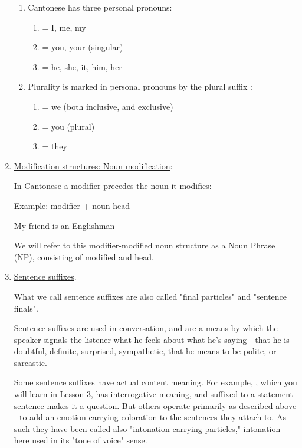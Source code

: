\begin{enumerate}
    \begin{enumerate}
        \item Cantonese has three personal pronouns:
        \begin{enumerate}
            \item {} = I, me, my
            \item {} = you, your (singular)
            \item {} = he, she, it, him, her
        \end{enumerate}
        \item Plurality is marked in personal pronouns by the plural suffix :
        \begin{enumerate}
            \item {} = we (both inclusive, and exclusive)
            \item {} = you (plural)
            \item {} = they
        \end{enumerate}
    \end{enumerate}

    \item \underline{Modification structures: Noun modification}:

    In Cantonese a modifier precedes the noun it modifies:

    Example: modifier + noun head

     My friend is an Englishman

    We will refer to this modifier-modified noun structure as a Noun Phrase (NP), consisting of modified and head.

    \item \underline{Sentence suffixes}.

    What we call sentence suffixes are also called "final particles" and "sentence finals".

    Sentence suffixes are used in conversation, and are a means by which the speaker signals the listener what he feels about what he's saying - that he is doubtful, definite, surprised, sympathetic, that he means to be polite, or sarcastic.

    Some sentence suffixes have actual content meaning. For example, , which you will learn in Lesson 3, has interrogative meaning, and suffixed to a statement sentence makes it a question. But others operate primarily as described above - to add an emotion-carrying coloration to the sentences they attach to. As such they have been called also "intonation-carrying particles," intonation here used in its "tone of voice" sense.


\end{enumerate}
